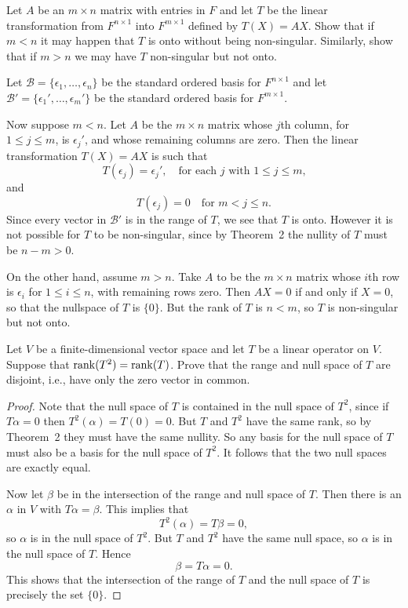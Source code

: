  Let $A$ be an $m\times n$ matrix with entries in $F$ and
let $T$ be the linear transformation from $F^{n\times1}$ into
$F^{m\times1}$ defined by $T(X) = AX$. Show that if $m < n$ it may
happen that $T$ is onto without being non-singular. Similarly, show
that if $m > n$ we may have $T$ non-singular but not onto.
\begin{solution}
  Let $\mathcal{B} = \{\epsilon_1,\dots,\epsilon_n\}$ be the standard
  ordered basis for $F^{n\times1}$ and let
  $\mathcal{B}' = \{\epsilon_1',\dots,\epsilon_m'\}$ be the standard
  ordered basis for $F^{m\times1}$.

  Now suppose $m < n$. Let $A$ be the $m\times n$ matrix whose $j$th
  column, for $1\leq j\leq m$, is $\epsilon_j'$, and whose remaining
  columns are zero. Then the linear transformation $T(X) = AX$ is such
  that
  \begin{equation*}
    T(\epsilon_j) = \epsilon_j', \quad
    \text{for each $j$ with $1\leq j\leq m$,}
  \end{equation*}
  and
  \begin{equation*}
    T(\epsilon_j) = 0 \quad
    \text{for $m<j\leq n$.}
  \end{equation*}
  Since every vector in $\mathcal{B}'$ is in the range of $T$, we see
  that $T$ is onto. However it is not possible for $T$ to be
  non-singular, since by Theorem~2 the nullity of $T$ must be
  $n - m > 0$.

  On the other hand, assume $m > n$. Take $A$ to be the $m\times n$
  matrix whose $i$th row is $\epsilon_i$ for $1\leq i\leq n$, with
  remaining rows zero. Then $AX = 0$ if and only if $X = 0$, so that
  the nullspace of $T$ is $\{0\}$. But the rank of $T$ is $n < m$, so
  $T$ is non-singular but not onto.
\end{solution}

 Let $V$ be a finite-dimensional vector space and let $T$
be a linear operator on $V$. Suppose that $\operatorname{rank}(T^2) =
\operatorname{rank}(T)$. Prove that the range and null space of $T$ are disjoint,
i.e., have only the zero vector in common.
\begin{proof}
  Note that the null space of $T$ is contained in the null space of
  $T^2$, since if $T\alpha = 0$ then $T^2(\alpha) = T(0) = 0$. But $T$
  and $T^2$ have the same rank, so by Theorem~2 they must have the
  same nullity. So any basis for the null space of $T$ must also be a
  basis for the null space of $T^2$. It follows that the two null
  spaces are exactly equal.

  Now let $\beta$ be in the intersection of the range and null space
  of $T$. Then there is an $\alpha$ in $V$ with $T\alpha =
  \beta$. This implies that
  \begin{equation*}
    T^2(\alpha) = T\beta = 0,
  \end{equation*}
  so $\alpha$ is in the null space of $T^2$. But $T$ and $T^2$ have
  the same null space, so $\alpha$ is in the null space of $T$. Hence
  \begin{equation*}
    \beta = T\alpha = 0.
  \end{equation*}
  This shows that the intersection of the range of $T$ and the null
  space of $T$ is precisely the set $\{0\}$.
\end{proof}

